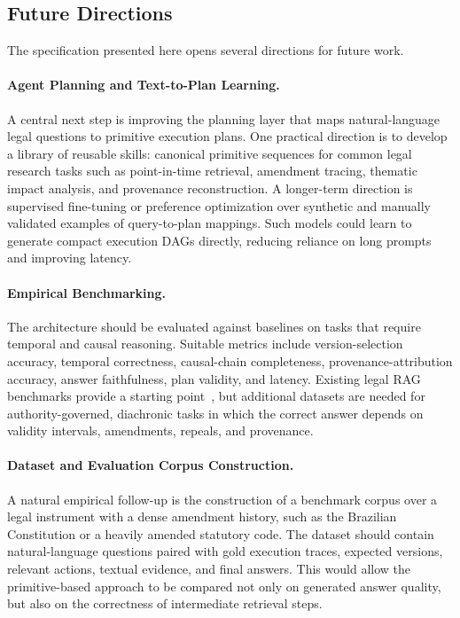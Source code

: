 \documentclass[11pt]{article}
\begin{document}
\subsection{Future Directions}

The specification presented here opens several directions for future work.

\paragraph{Agent Planning and Text-to-Plan Learning.}
A central next step is improving the planning layer that maps natural-language legal questions to primitive execution plans. One practical direction is to develop a library of reusable skills: canonical primitive sequences for common legal research tasks such as point-in-time retrieval, amendment tracing, thematic impact analysis, and provenance reconstruction. A longer-term direction is supervised fine-tuning or preference optimization over synthetic and manually validated examples of query-to-plan mappings. Such models could learn to generate compact execution DAGs directly, reducing reliance on long prompts and improving latency.

\paragraph{Empirical Benchmarking.}
The architecture should be evaluated against baselines on tasks that require temporal and causal reasoning. Suitable metrics include version-selection accuracy, temporal correctness, causal-chain completeness, provenance-attribution accuracy, answer faithfulness, plan validity, and latency. Existing legal RAG benchmarks provide a starting point~\cite{pipitone2024legalbench}, but additional datasets are needed for authority-governed, diachronic tasks in which the correct answer depends on validity intervals, amendments, repeals, and provenance.

\paragraph{Dataset and Evaluation Corpus Construction.}
A natural empirical follow-up is the construction of a benchmark corpus over a legal instrument with a dense amendment history, such as the Brazilian Constitution or a heavily amended statutory code. The dataset should contain natural-language questions paired with gold execution traces, expected versions, relevant actions, textual evidence, and final answers. This would allow the primitive-based approach to be compared not only on generated answer quality, but also on the correctness of intermediate retrieval steps.
\end{document}
